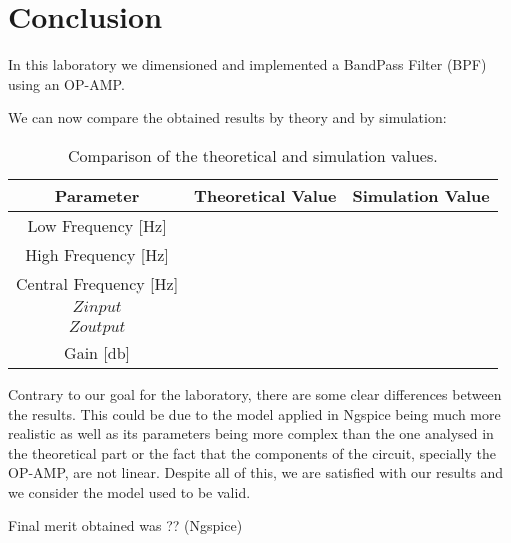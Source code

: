 \newpage
\section{Conclusion}
\label{sec:conclusion}

In this laboratory we dimensioned and implemented a BandPass Filter (BPF) using an OP-AMP.

We can now compare the obtained results by theory and by simulation:

\begin{table}[h]
    \centering
    \begin{tabular}{|c|c|c|}
    \hline
    {\bf Parameter} & {\bf Theoretical Value}& {\bf Simulation Value}\\
    \hline\hline
      Low Frequency [Hz] &  & \\
    \hline
    High Frequency [Hz] &  & \\
    \hline
   Central Frequency [Hz] &  & \\
   \hline
     $Z{input}$ &  & \\
    \hline
     $Z{output}$ &  & \\
    \hline
      Gain [db] &  & \\
    \hline
    \end{tabular}
    \caption{Comparison of the theoretical and simulation values.}
    \label{tab:values}
\end{table}

Contrary to our goal for the laboratory, there are some clear differences between the results. This could be due to the model applied in Ngspice being much more realistic as well as its parameters being more complex than the one analysed in the theoretical part or the fact that the components of the circuit, specially the OP-AMP, are not linear. 
Despite all of this, we are satisfied with our results and we consider the model used to be valid.


Final merit obtained was ?? (Ngspice)

